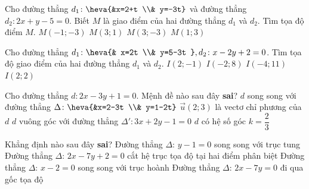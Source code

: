 	\begin{ex}%
		Cho đường thẳng $d_1 \colon \heva{&x=2+t \\& y=-3t}$ và đường thẳng $d_2 \colon 2x+y-5=0$. Biết $M$ là giao điểm của hai đường thẳng $d_1$ và $d_2$. Tìm tọa độ điểm $M$.
		\choice
		{$M(-1;-3)$}
		{$M(3;1)$}
		{$M(3;-3)$}
		{\True $M(1;3)$}
	\end{ex}
	\begin{ex}%
		Cho đường thẳng $d_1 \colon \heva{& x=2t \\& y=5-3t },d_2 \colon x-2y+2=0$. Tìm tọa độ giao điểm của hai đường thẳng $d_1$ và $d_2$.
		\choice
		{$I(2;-1)$}
		{$I(-2;8)$}
		{$I(-4;11)$}
		{\True $I(2;2)$}
	\end{ex}
	\begin{ex}%
		Cho đường thẳng $d \colon 2x-3y+1=0$. Mệnh đề nào sau đây \textbf{sai}?
		\choice
		{$d$ song song với đường thẳng $\Delta \colon \heva{&x=2-3t \\& y=1-2t}$}
		{\True $\overrightarrow{u}(2;3)$ là vectơ chỉ phương của $d$}
		{$d$ vuông góc với đường thẳng ${\Delta}' \colon 3x+2y-1=0$}
		{$d$ có hệ số góc $k=\dfrac{2}{3}$}
	\end{ex}
	\begin{ex}%
		Khẳng định nào sau đây \textbf{sai}?
		\choice
		{\True Đường thẳng $\Delta$: $y-1=0$ song song với trục tung}
		{Đường thẳng $\Delta$: $2x-7y+2=0$ cắt hệ trục tọa độ tại hai điểm phân biệt}
		{Đường thẳng $\Delta$: $x-2=0$ song song với trục hoành}
		{Đường thẳng $\Delta$: $2x-7y=0$ đi qua gốc tọa độ}
	\end{ex}
